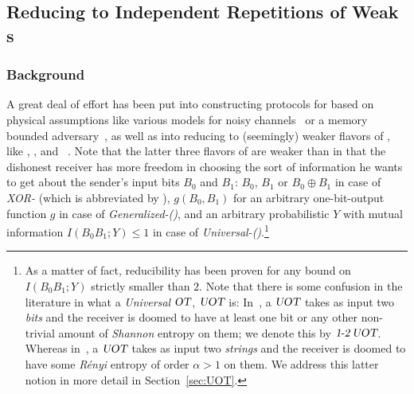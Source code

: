 \subsection[Reducing \lStringOT to Repetitions of Weak \OT\!\!s]{Reducing \lStringOT to Independent Repetitions of Weak \OT
  \!\!s}\label{sec:reductions}


\subsubsection{Background}
A great deal of effort has been put into constructing protocols for
\lStringOT based on physical assumptions like various models for noisy
channels~\cite{CK88,DKS99,DFMS04,CMW04} or a memory bounded
adversary~\cite{CCM98,Din01,DHRS04}, as well as into reducing
\lStringOT to (seemingly) weaker flavors of \pOT, like \RabinOT, \XOT,
\GOT and \BUOT~\cite{Crepeau87,BC97,Cachin98,Wolf00,BCW03,CS06,
  Wullschleger07}.  Note that the latter three flavors of \pOT are
weaker than \OT in that the dishonest receiver has more freedom in
choosing the sort of information he wants to get about the sender's
input bits $B_0$ and $B_1$: $B_0$, $B_1$ or $B_0 \oplus B_1$ in case
of \textsl{\onetwo\:XOR-\pOT} (which is abbreviated by \XOT),
$g(B_0,B_1)$ for an arbitrary one-bit-output function $g$ in case of
\textsl{\onetwo\: Generalized-\pOT (\GOT)}, and an arbitrary
probabilistic $Y$ with mutual information $I(B_0 B_1;Y) \leq 1$ in
case of \textsl{\onetwo\: Universal-\pOT (\BUOT)}.\footnote{As a
  matter of fact, reducibility has been proven for any bound on $I(B_0
  B_1;Y)$ strictly smaller than $2$.  Note that there is some
  confusion in the literature in what a {\em Universal} $\pOT$,
  $\pUOT$ is: In~\cite{BC97,Wolf00,BCW03}, a $\pUOT$ takes as
  input two {\em bits} and the receiver is doomed to have at least one
  bit or any other
non-trivial amount of {\em Shannon} entropy on them; we denote this %
by $\BUOT$. Whereas in~\cite{Cachin98}, a $\pUOT$ takes as input two
{\em strings} and the receiver is doomed to have some {\em R\'enyi}
entropy of order $\alpha > 1$ on them. We address this latter notion in more detail in
Section~\ref{sec:UOT}. }

